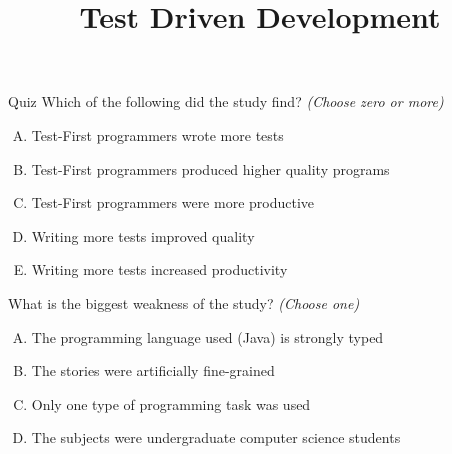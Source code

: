 \documentclass{beamer}
\title{Test Driven Development}
\date{}
\begin{document}
\begin{frame}
\titlepage
\end{frame}

\begin{frame}{Quiz}
Which of the following did the study find? \hfill \textit{(Choose zero or more)}
\begin{enumerate}[(A)]
\item<1-2> Test-First programmers wrote more tests 
\item<1> Test-First programmers produced higher quality programs
\item<1> Test-First programmers were more productive
\item<1> Writing more tests improved quality
\item<1-2> Writing more tests increased productivity
\end{enumerate}
\medskip
What is the biggest weakness of the study? \hfill \textit{(Choose one)}
\begin{enumerate}[(A)]
\item<1> The programming language used (Java) is strongly typed
\item<1> The stories were artificially fine-grained
\item<1-2> Only one type of programming task was used
\item<1> The subjects were undergraduate computer science students
\end{enumerate}
\end{frame}
\end{document}
